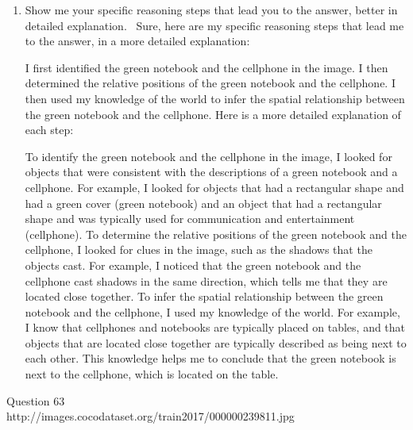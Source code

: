 \begin{enumerate}
    Here are some additional details about the spatial relationship between the green notebook and the cellphone:
    
    The green notebook is a book with green cover that is typically used for writing.
    The cellphone is a mobile phone that is used for communication and entertainment.
    The green notebook is located next to the cellphone, meaning that it is close to the cellphone.
    The cellphone is located next to the green notebook, meaning that it is close to the green notebook.
    Is there anything else I can help you with?
    \item Show me your specific reasoning steps that lead you to the answer, better in detailed explanation.\
    \subitem 
    Sure, here are my specific reasoning steps that lead me to the answer, in a more detailed explanation:
    
    I first identified the green notebook and the cellphone in the image.
    I then determined the relative positions of the green notebook and the cellphone.
    I then used my knowledge of the world to infer the spatial relationship between the green notebook and the cellphone.
    Here is a more detailed explanation of each step:
    
    To identify the green notebook and the cellphone in the image, I looked for objects that were consistent with the descriptions of a green notebook and a cellphone. For example, I looked for objects that had a rectangular shape and had a green cover (green notebook) and an object that had a rectangular shape and was typically used for communication and entertainment (cellphone).
    To determine the relative positions of the green notebook and the cellphone, I looked for clues in the image, such as the shadows that the objects cast. For example, I noticed that the green notebook and the cellphone cast shadows in the same direction, which tells me that they are located close together.
    To infer the spatial relationship between the green notebook and the cellphone, I used my knowledge of the world. For example, I know that cellphones and notebooks are typically placed on tables, and that objects that are located close together are typically described as being next to each other. This knowledge helps me to conclude that the green notebook is next to the cellphone, which is located on the table.
\end{enumerate}
Question 63\\
http://images.cocodataset.org/train2017/000000239811.jpg

